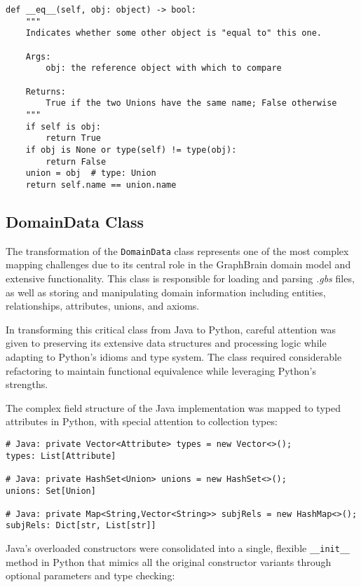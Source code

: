 \documentclass[12pt,a4paper]{article}
\begin{document}
\begin{verbatim}
def __eq__(self, obj: object) -> bool:
    """
    Indicates whether some other object is "equal to" this one.
    
    Args:
        obj: the reference object with which to compare
        
    Returns:
        True if the two Unions have the same name; False otherwise
    """
    if self is obj:
        return True
    if obj is None or type(self) != type(obj):
        return False
    union = obj  # type: Union
    return self.name == union.name
\end{verbatim}



\subsection{DomainData Class}
The transformation of the \texttt{DomainData} class represents one of the most complex mapping challenges due to its central role in the GraphBrain domain model and extensive functionality. This class is responsible for loading and parsing \textit{.gbs} files, as well as storing and manipulating domain information including entities, relationships, attributes, unions, and axioms.

In transforming this critical class from Java to Python, careful attention was given to preserving its extensive data structures and processing logic while adapting to Python's idioms and type system. The class required considerable refactoring to maintain functional equivalence while leveraging Python's strengths.

The complex field structure of the Java implementation was mapped to typed attributes in Python, with special attention to collection types:

\begin{verbatim}
# Java: private Vector<Attribute> types = new Vector<>();
types: List[Attribute]  

# Java: private HashSet<Union> unions = new HashSet<>();
unions: Set[Union]  

# Java: private Map<String,Vector<String>> subjRels = new HashMap<>();
subjRels: Dict[str, List[str]]  
\end{verbatim}

Java's overloaded constructors were consolidated into a single, flexible \texttt{\_\_init\_\_} method in Python that mimics all the original constructor variants through optional parameters and type checking:
\end{document}
